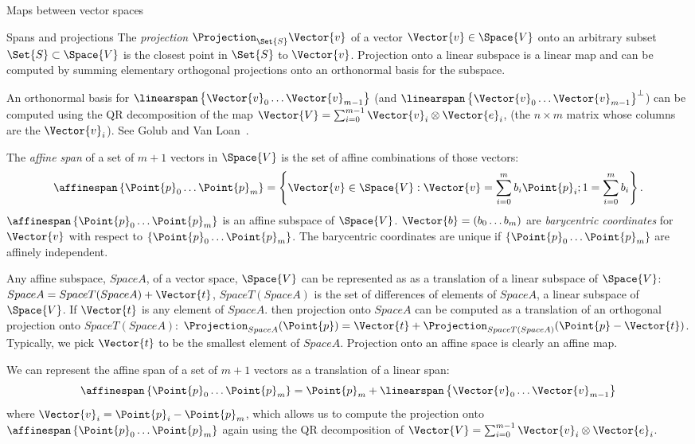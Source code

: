 \begin{plSection}{Maps between vector spaces}
\begin{plSection}{Spans and projections}
The {\it projection} $\Projection_{\Set{S}} \Vector{v}$ 
of a vector $\Vector{v} \in \Space{V}$
onto an arbitrary subset $\Set{S} \subset \Space{V}$
is the closest point in $\Set{S}$ to $\Vector{v}$.
Projection onto a linear subspace is a linear map and
can be computed by summing
elementary orthogonal projections onto an orthonormal basis 
for the subspace.

An orthonormal basis for 
$\linearspan\left\{ \Vector{v}_0 \ldots \Vector{v}_{m-1} \right\}$
(and $\linearspan\left\{ \Vector{v}_0 \ldots \Vector{v}_{m-1} \right\}^\perp$)
can be computed using the QR decomposition
of the map $\Vector{V} = \sum_{i=0}^{m-1} \Vector{v}_i \otimes \Vector{e}_i$,
(the $n \times m$ matrix whose columns are the $\Vector{v}_i$).
See Golub and Van Loan~\cite[sec.~5.2]{GolubVanLoan:1996}.

The {\it affine span} of a set of $m+1$ vectors in $\Space{V}$
is the set of affine combinations of those vectors:
\begin{equation}
\affinespan\left\{ \Point{p}_0 \ldots \Point{p}_{m} \right\} = \left\{\Vector{v} \in \Space{V} : \Vector{v} = \sum_{i=0}^{m} b_i \Point{p}_i;
1 = \sum_{i=0}^{m} b_i \right\}.
\end{equation}
$\affinespan\left\{ \Point{p}_0 \ldots \Point{p}_{m} \right\}$ 
is an affine subspace of $\Space{V}$.
$\Vector{b} = ( b_0 \ldots b_m )$ are {\it barycentric coordinates}
for $\Vector{v}$ with respect to 
$\left\{ \Point{p}_0 \ldots \Point{p}_{m} \right\}$.
The barycentric coordinates are unique if 
$\left\{ \Point{p}_0 \ldots \Point{p}_{m} \right\}$
are affinely independent.

Any affine subspace, $Space{A}$, of a vector space, $\Space{V}$ can be represented as
as a translation of a linear subspace of $\Space{V}$:
$Space{A} = Space{T}(Space{A}) + \Vector{t}$,
$Space{T}(Space{A})$ is the set of differences of elements of $Space{A}$,
a linear subspace of $\Space{V}$.
If $\Vector{t}$ is any element of $Space{A}$.
then projection onto $Space{A}$
can be computed as a translation of an orthogonal projection onto $Space{T}(Space{A})$:
$\Projection_{Space{A}} (\Point{p}) = \Vector{t} + \Projection_{Space{T}(Space{A})} (\Point{p} - \Vector{t})$.
Typically, we pick $\Vector{t}$ to be the smallest element of $Space{A}$.
Projection onto an affine space is clearly an affine map.

We can represent the affine span of a set of $m+1$ vectors
as a translation of a linear span:
\begin{equation}
\affinespan\left\{ \Point{p}_0 \ldots \Point{p}_{m} \right\} = 
\Point{p}_m + \linearspan\left\{\Vector{v}_0 \ldots \Vector{v}_{m-1}\right\}
\end{equation}
where $\Vector{v}_i = \Point{p}_i - \Point{p}_m$,
which allows us to compute the projection onto
$\affinespan\left\{ \Point{p}_0 \ldots \Point{p}_{m} \right\}$
again using the QR decomposition
of $\Vector{V} = \sum_{i=0}^{m-1} \Vector{v}_i \otimes \Vector{e}_i$.


\end{plSection}
\end{plSection}
